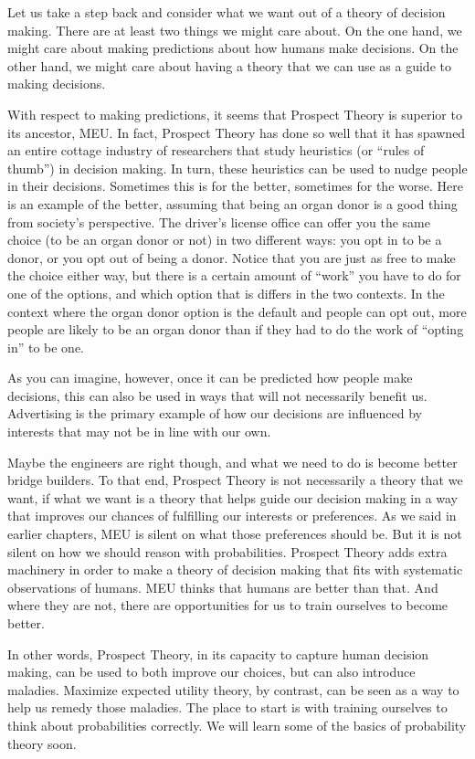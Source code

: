 \documentclass[]{tufte-book}
\begin{document}
Let us take a step back and consider what we want out of a theory of decision making. There are at least two things we might care about. On the one hand, we might care about making predictions about how humans make decisions. On the other hand, we might care about having a theory that we can use as a guide to making decisions.

With respect to making predictions, it seems that Prospect Theory is superior to its ancestor, MEU. In fact, Prospect Theory has done so well that it has spawned an entire cottage industry of researchers that study heuristics (or ``rules of thumb'') in decision making. In turn, these heuristics can be used to nudge people in their decisions. Sometimes this is for the better, sometimes for the worse. Here is an example of the better, assuming that being an organ donor is a good thing from society's perspective. The driver's license office can offer you the same choice (to be an organ donor or not) in two different ways: you opt in to be a donor, or you opt out of being a donor. Notice that you are just as free to make the choice either way, but there is a certain amount of ``work'' you have to do for one of the options, and which option that is differs in the two contexts. In the context where the organ donor option is the default and people can opt out, more people are likely to be an organ donor than if they had to do the work of ``opting in'' to be one.

As you can imagine, however, once it can be predicted how people make decisions, this can also be used in ways that will not necessarily benefit us. Advertising is the primary example of how our decisions are influenced by interests that may not be in line with our own.

Maybe the engineers are right though, and what we need to do is become better bridge builders. To that end, Prospect Theory is not necessarily a theory that we want, if what we want is a theory that helps guide our decision making in a way that improves our chances of fulfilling our interests or preferences. As we said in earlier chapters, MEU is silent on what those preferences should be. But it is not silent on how we should reason with probabilities. Prospect Theory adds extra machinery in order to make a theory of decision making that fits with systematic observations of humans. MEU thinks that humans are better than that. And where they are not, there are opportunities for us to train ourselves to become better.

In other words, Prospect Theory, in its capacity to capture human decision making, can be used to both improve our choices, but can also introduce maladies. Maximize expected utility theory, by contrast, can be seen as a way to help us remedy those maladies. The place to start is with training ourselves to think about probabilities correctly. We will learn some of the basics of probability theory soon.
\end{document}
